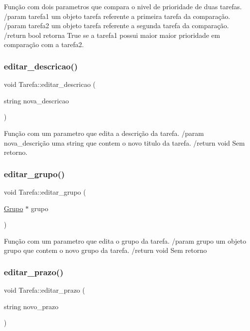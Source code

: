 Função com dois parametros que compara o nivel de prioridade de duas tarefas. /param tarefa1 um objeto tarefa referente a primeira tarefa da comparação. /param tarefa2 um objeto tarefa referente a segunda tarefa da comparação. /return bool retorna True se a tarefa1 possui maior maior prioridade em comparação com a tarefa2. \mbox{\label{classTarefa_afb4366be9b8e3e5c16bebc9cb80e5380}} 
\subsubsection{\texorpdfstring{editar\+\_\+descricao()}{editar\_descricao()}}
{\footnotesize\ttfamily void Tarefa\+::editar\+\_\+descricao (\begin{DoxyParamCaption}\item[{string}]{nova\+\_\+descricao }\end{DoxyParamCaption})}

Função com um parametro que edita a descrição da tarefa. /param nova\+\_\+descrição uma string que contem o novo titulo da tarefa. /return void Sem retorno. \mbox{\label{classTarefa_abfe620f867e896cb77d016b229e92f6e}} 
\subsubsection{\texorpdfstring{editar\+\_\+grupo()}{editar\_grupo()}}
{\footnotesize\ttfamily void Tarefa\+::editar\+\_\+grupo (\begin{DoxyParamCaption}\item[{\hyperlink{classGrupo}{Grupo} $\ast$}]{grupo }\end{DoxyParamCaption})}

Função com um parametro que edita o grupo da tarefa. /param grupo um objeto grupo que contem o novo grupo da tarefa. /return void Sem retorno \mbox{\label{classTarefa_abe764b58fe48c8d191a7fc3cea2e9b72}} 
\subsubsection{\texorpdfstring{editar\+\_\+prazo()}{editar\_prazo()}}
{\footnotesize\ttfamily void Tarefa\+::editar\+\_\+prazo (\begin{DoxyParamCaption}\item[{string}]{novo\+\_\+prazo }\end{DoxyParamCaption})}

